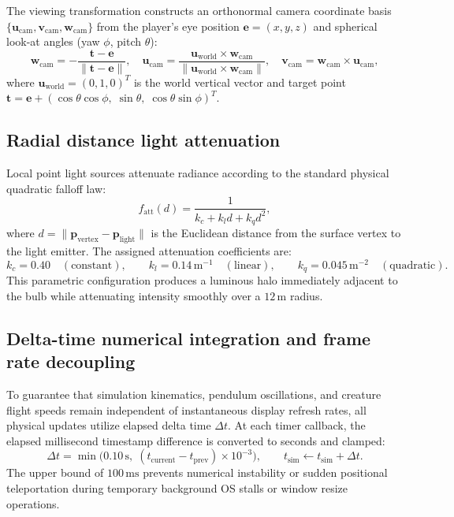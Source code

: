\documentclass[10pt,a4paper,oneside]{article}
\begin{document}
The viewing transformation constructs an orthonormal camera coordinate basis $\{\mathbf{u}_{\text{cam}}, \mathbf{v}_{\text{cam}}, \mathbf{w}_{\text{cam}}\}$ from the player's eye position $\mathbf{e} = (x, y, z)$ and spherical look-at angles (yaw $\phi$, pitch $\theta$):
\begin{equation}
\mathbf{w}_{\text{cam}} = -\frac{\mathbf{t} - \mathbf{e}}{\|\mathbf{t} - \mathbf{e}\|}, \quad
\mathbf{u}_{\text{cam}} = \frac{\mathbf{u}_{\text{world}} \times \mathbf{w}_{\text{cam}}}{\|\mathbf{u}_{\text{world}} \times \mathbf{w}_{\text{cam}}\|}, \quad
\mathbf{v}_{\text{cam}} = \mathbf{w}_{\text{cam}} \times \mathbf{u}_{\text{cam}},
\end{equation}
where $\mathbf{u}_{\text{world}} = (0, 1, 0)^T$ is the world vertical vector and target point $\mathbf{t} = \mathbf{e} + (\cos\theta\cos\phi, \; \sin\theta, \; \cos\theta\sin\phi)^T$.

\subsection{Radial distance light attenuation}
Local point light sources attenuate radiance according to the standard physical quadratic falloff law:
\begin{equation}
f_{\text{att}}(d) = \frac{1}{k_c + k_l d + k_q d^2},
\end{equation}
where $d = \|\mathbf{p}_{\text{vertex}} - \mathbf{p}_{\text{light}}\|$ is the Euclidean distance from the surface vertex to the light emitter. The assigned attenuation coefficients are:
\begin{equation}
k_c = 0.40 \quad (\text{constant}), \qquad
k_l = 0.14\,\mathrm{m}^{-1} \quad (\text{linear}), \qquad
k_q = 0.045\,\mathrm{m}^{-2} \quad (\text{quadratic}).
\end{equation}
This parametric configuration produces a luminous halo immediately adjacent to the bulb while attenuating intensity smoothly over a $12\,\mathrm{m}$ radius.

\subsection{Delta-time numerical integration and frame rate decoupling}
To guarantee that simulation kinematics, pendulum oscillations, and creature flight speeds remain independent of instantaneous display refresh rates, all physical updates utilize elapsed delta time $\Delta t$. At each timer callback, the elapsed millisecond timestamp difference is converted to seconds and clamped:
\begin{equation}
\Delta t = \min\big(0.10\,\mathrm{s}, \; (t_{\text{current}} - t_{\text{prev}}) \times 10^{-3}\big), \qquad
t_{\text{sim}} \leftarrow t_{\text{sim}} + \Delta t.
\end{equation}
The upper bound of $100\,\mathrm{ms}$ prevents numerical instability or sudden positional teleportation during temporary background OS stalls or window resize operations.
\end{document}
